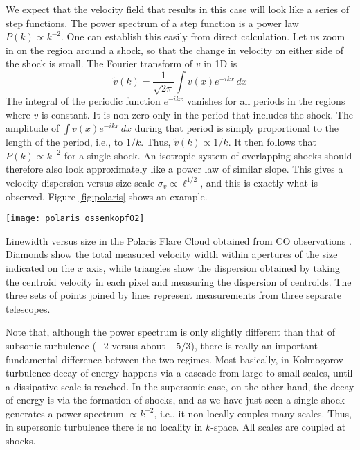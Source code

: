 We expect that the velocity field that results in this case will look like a series of step functions. The power spectrum of a step function is a power law $P(k)\propto k^{-2}$. One can establish this easily from direct calculation. Let us zoom in on the region around a shock, so that the change in velocity on either side of the shock is small. The Fourier transform of $v$ in 1D is
\begin{equation}
\tilde{v}(k) = \frac{1}{\sqrt{2\pi}} \int v(x) e^{-i kx}\, dx
\end{equation}
The integral of the periodic function $e^{-ikx}$ vanishes for all periods in the regions where $v$ is constant. It is non-zero only in the period that includes the shock. The amplitude of $\int v(x) e^{-i kx}\, dx$ during that period is simply proportional to the length of the period, i.e., to $1/k$. Thus, $\tilde{v}(k)\propto 1/k$. It then follows that $P(k)\propto k^{-2}$ for a single shock. An isotropic system of overlapping shocks should therefore also look approximately like a power law of similar slope. This gives a velocity dispersion versus size scale $\sigma_v\propto \ell^{1/2}$, and this is exactly what is observed. Figure \ref{fig:polaris} shows an example.

\begin{marginfigure}
\texttt{[image: polaris\_ossenkopf02]}
\caption[Linewidth versus size in the Polaris Flare cloud]{
\label{fig:polaris}
Linewidth versus size in the Polaris Flare Cloud obtained from CO observations \citep{ossenkopf02a}. Diamonds show the total measured velocity width within apertures of the size indicated on the $x$ axis, while triangles show the dispersion obtained by taking the centroid velocity in each pixel and measuring the dispersion of centroids. The three sets of points joined by lines represent measurements from three separate telescopes.
}
\end{marginfigure}

Note that, although the power spectrum is only slightly different than that of subsonic turbulence ($-2$ versus about $-5/3$), there is really an important fundamental difference between the two regimes. Most basically, in Kolmogorov turbulence decay of energy happens via a cascade from large to small scales, until a dissipative scale is reached. In the supersonic case, on the other hand, the decay of energy is via the formation of shocks, and as we have just seen a single shock generates a power spectrum $\propto k^{-2}$, i.e., it non-locally couples many scales. Thus, in supersonic turbulence there is no locality in $k$-space. All scales are coupled at shocks.

